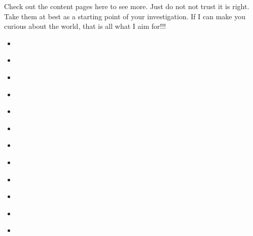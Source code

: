\documentclass[letterpaper,10pt,english]{jupyterBook}
\begin{document}
\sphinxAtStartPar
Check out the content pages here to see more.  Just do not not trust it is right.  Take them at best as a starting point of your investigation. If I can make you curious about the world, that is all what I aim for!!!
\begin{itemize}
\item {} 
\sphinxAtStartPar
{\hyperref[\detokenize{MacTwgssA1-think::doc}]{}}

\item {} 
\sphinxAtStartPar
{\hyperref[\detokenize{MacTwgssA2-zero::doc}]{}}

\item {} 
\sphinxAtStartPar
{\hyperref[\detokenize{MacTwgssA3-imgNo::doc}]{}}

\item {} 
\sphinxAtStartPar
{\hyperref[\detokenize{MacTwgssA4-splitImgNo::doc}]{}}

\item {} 
\sphinxAtStartPar
{\hyperref[\detokenize{MacTwgssAx-App::doc}]{}}

\item {} 
\sphinxAtStartPar
{\hyperref[\detokenize{intro::doc}]{}}

\item {} 
\sphinxAtStartPar
{\hyperref[\detokenize{markdown::doc}]{}}

\item {} 
\sphinxAtStartPar
{\hyperref[\detokenize{notebooks::doc}]{}}

\item {} 
\sphinxAtStartPar
{\hyperref[\detokenize{markdown-notebooks::doc}]{}}

\item {} 
\sphinxAtStartPar
{\hyperref[\detokenize{fAe::doc}]{}}

\item {} 
\sphinxAtStartPar
{\hyperref[\detokenize{fFy::doc}]{}}

\item {} 
\sphinxAtStartPar
{\hyperref[\detokenize{fnn::doc}]{}}


\end{itemize}
\end{document}
